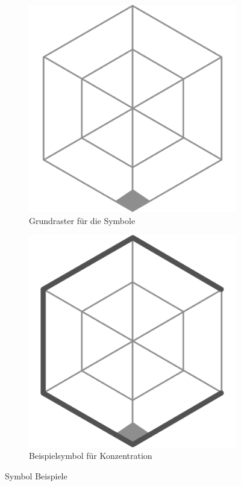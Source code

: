 \documentclass{article}
\begin{document}
\begin{figure}[h]
\centering
\begin{subfigure}{.4\textwidth}
  \centering
  \includegraphics[width=.7\linewidth]{images/sigil-base.png}
  \caption{Grundraster für die Symbole}
  \label{fig:sub1}
\end{subfigure}
\begin{subfigure}{.4\textwidth}
  \centering
  \includegraphics[width=.7\linewidth]{images/sigil-example.png}
  \caption{Beispielsymbol für Konzentration}
  \label{fig:sub2}
\end{subfigure}
\caption{Symbol Beispiele}
\label{fig:test}
\end{figure}
\end{document}
